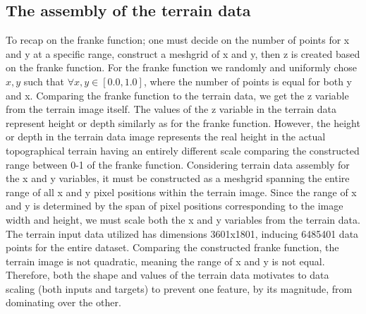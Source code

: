 \documentclass[11pt, a4paper]{article}
\begin{document}
\subsection*{The assembly of the terrain data}
To recap on the franke function; one must decide on the number of points for x and y at a specific range, construct a meshgrid of x and y, then z is created based on
the franke function. For the franke function we randomly and uniformly chose $x,y$ such that $\forall x,y \in{[0.0,1.0]}$, where the number of points is equal for both
y and x. Comparing the franke function to the terrain data, we get the z variable from the terrain image itself. The values of the z variable in the terrain data represent
height or depth similarly as for the franke function. However, the height or depth in the terrain data image represents the real height in the actual topographical terrain
having an entirely different scale comparing the constructed range between 0-1 of the franke function. Considering terrain data assembly for the x and y variables,
it must be constructed as a meshgrid spanning the entire range of all x and y pixel positions within the terrain image. Since the range of x and y is determined by
the span of pixel positions corresponding to the image width and height, we must scale both the x and y variables from the terrain data. The terrain input data utilized
has dimensions 3601x1801, inducing 6485401 data points for the entire dataset. Comparing the constructed franke function, the terrain image is not quadratic, meaning
the range of x and y is not equal. Therefore, both the shape and values of the terrain data motivates to data scaling (both inputs and targets) to prevent one feature,
by its magnitude, from dominating over the other.
\end{document}
